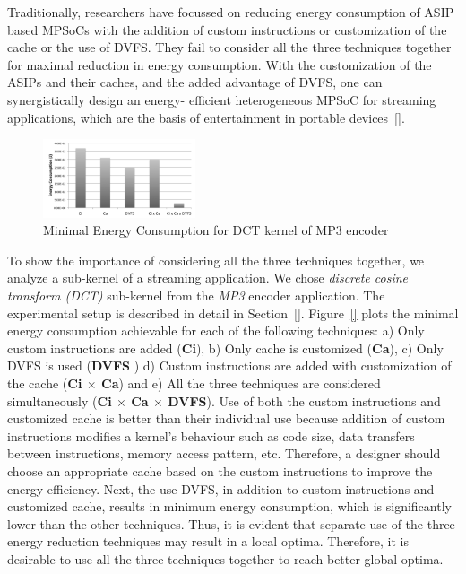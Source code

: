 Traditionally, researchers have focussed on reducing energy consumption
of ASIP based MPSoCs with the addition of custom instructions or
customization of the cache or the use of DVFS. They fail to consider
all the three techniques together for maximal reduction in energy
consumption. With the customization of the ASIPs and their caches, and
the added advantage of DVFS, one can synergistically design an energy-
efficient heterogeneous MPSoC for streaming applications, which are the
basis of entertainment in portable devices~\ref{}.

\begin{figure}[h]
\label{fig:motivation}
\center
\includegraphics[width=0.40\textwidth]{motivation.png}
\caption {Minimal Energy Consumption for DCT kernel of MP3 encoder}
\end{figure}

To show the importance of considering all the three techniques
together, we analyze a sub-kernel of a streaming application. We
chose \textit{discrete cosine transform (DCT)} sub-kernel from the
\textit{MP3} encoder application. The experimental setup is described
in detail in Section~\ref{}. Figure~\ref{} plots the minimal energy
consumption achievable for each of the following techniques: a) Only custom instructions are added (\textbf{Ci}), b) Only cache
is customized (\textbf{Ca}), c) Only DVFS is used (\textbf{DVFS}
) d) Custom instructions are added with customization of the cache
(\textbf{Ci $\times$ Ca}) and e) All the three techniques are considered
simultaneously (\textbf{Ci $\times$ Ca $\times$ DVFS}). Use of both the
custom instructions and customized cache is better than their individual
use because addition of custom instructions modifies a kernel’s behaviour
such as code size, data transfers between instructions, memory access
pattern, etc. Therefore, a designer should choose an appropriate cache
based on the custom instructions to improve the energy efficiency. Next,
the use DVFS, in addition to custom instructions and customized cache,
results in minimum energy consumption, which is significantly lower than
the other techniques. Thus, it is evident that separate use of the three
energy reduction techniques may result in a local optima. Therefore, it
is desirable to use all the three techniques together to reach better
global optima.

